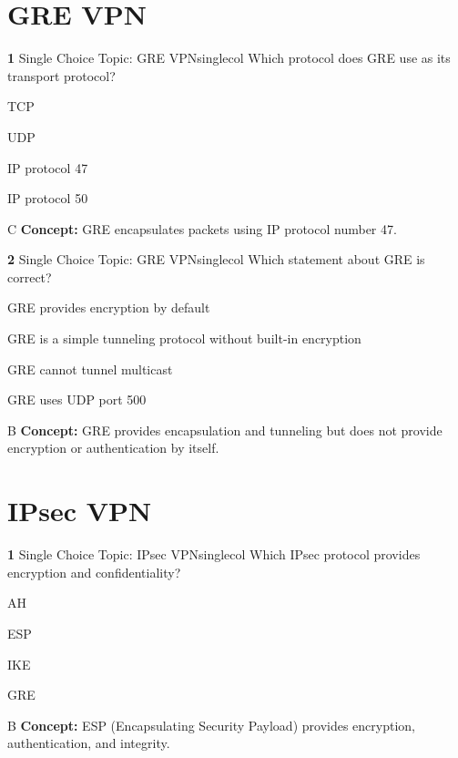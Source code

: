 \documentclass[10pt,a4paper]{article}
\begin{document}
\section{GRE VPN}
\begin{qcard}{\color{white}\textbf{1} \hfill \small Single Choice \textbar{} Topic: GRE VPN}{singlecol}
Which protocol does GRE use as its transport protocol?

\begin{qoptions}
\item TCP
\item UDP
\item IP protocol 47
\item IP protocol 50
\end{qoptions}
\begin{explainbox}{C}
\textbf{Concept:} GRE encapsulates packets using IP protocol number 47.
\end{explainbox}
\end{qcard}

\begin{qcard}{\color{white}\textbf{2} \hfill \small Single Choice \textbar{} Topic: GRE VPN}{singlecol}
Which statement about GRE is correct?

\begin{qoptions}
\item GRE provides encryption by default
\item GRE is a simple tunneling protocol without built-in encryption
\item GRE cannot tunnel multicast
\item GRE uses UDP port 500
\end{qoptions}
\begin{explainbox}{B}
\textbf{Concept:} GRE provides encapsulation and tunneling but does not provide encryption or authentication by itself.
\end{explainbox}
\end{qcard}

\section{IPsec VPN}
\begin{qcard}{\color{white}\textbf{1} \hfill \small Single Choice \textbar{} Topic: IPsec VPN}{singlecol}
Which IPsec protocol provides encryption and confidentiality?

\begin{qoptions}
\item AH
\item ESP
\item IKE
\item GRE
\end{qoptions}
\begin{explainbox}{B}
\textbf{Concept:} ESP (Encapsulating Security Payload) provides encryption, authentication, and integrity.
\end{explainbox}
\end{qcard}
\end{document}
